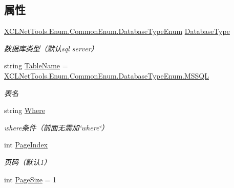 \subsection*{属性}
\begin{DoxyCompactItemize}
\item 
\hyperlink{class_x_c_l_net_tools_1_1_enum_1_1_common_enum_a4c4edc085935542b75e6386cb261ab4b}{X\+C\+L\+Net\+Tools.\+Enum.\+Common\+Enum.\+Database\+Type\+Enum} \hyperlink{class_x_c_l_net_tools_1_1_entity_1_1_sql_pager_condition_entity_a58c76c39c2a5062a6377a3e0a550ec9c}{Database\+Type}
\begin{DoxyCompactList}\small\item\em 数据库类型（默认sql server） \end{DoxyCompactList}\item 
string \hyperlink{class_x_c_l_net_tools_1_1_entity_1_1_sql_pager_condition_entity_ac4a6c5b0eeef5c0ce63cd3aa15c91e15}{Table\+Name} = \hyperlink{class_x_c_l_net_tools_1_1_enum_1_1_common_enum_a4c4edc085935542b75e6386cb261ab4ba1d37e2cfa8532be01d3f89c76ccfe4a9}{X\+C\+L\+Net\+Tools.\+Enum.\+Common\+Enum.\+Database\+Type\+Enum.\+M\+S\+S\+QL}
\begin{DoxyCompactList}\small\item\em 表名 \end{DoxyCompactList}\item 
string \hyperlink{class_x_c_l_net_tools_1_1_entity_1_1_sql_pager_condition_entity_a0201ec19db112ae1787225c4e03a9b43}{Where}
\begin{DoxyCompactList}\small\item\em where条件（前面无需加\char`\"{}where\char`\"{}） \end{DoxyCompactList}\item 
int \hyperlink{class_x_c_l_net_tools_1_1_entity_1_1_sql_pager_condition_entity_a1550964ce65f83eb6fcc061fef6774a6}{Page\+Index}
\begin{DoxyCompactList}\small\item\em 页码（默认1） \end{DoxyCompactList}\item 
int \hyperlink{class_x_c_l_net_tools_1_1_entity_1_1_sql_pager_condition_entity_aaac0f703651e83bd800ff4e90171300a}{Page\+Size} = 1

\end{DoxyCompactItemize}
